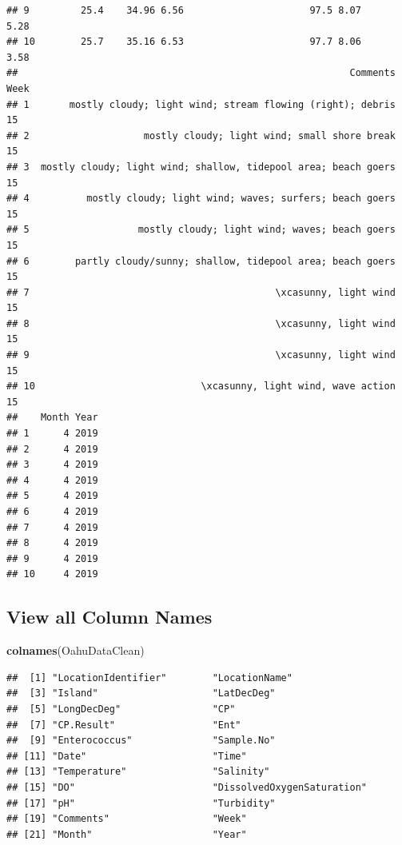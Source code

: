 \documentclass[12pt,]{article}
\newenvironment{Shaded}{\begin{snugshade}}{\end{snugshade}}
\newcommand{\KeywordTok}[1]{\textcolor[rgb]{0.13,0.29,0.53}{\textbf{#1}}}
\newcommand{\NormalTok}[1]{#1}
\begin{document}
\begin{verbatim}
## 9         25.4    34.96 6.56                      97.5 8.07      5.28
## 10        25.7    35.16 6.53                      97.7 8.06      3.58
##                                                          Comments Week
## 1       mostly cloudy; light wind; stream flowing (right); debris   15
## 2                    mostly cloudy; light wind; small shore break   15
## 3  mostly cloudy; light wind; shallow, tidepool area; beach goers   15
## 4          mostly cloudy; light wind; waves; surfers; beach goers   15
## 5                   mostly cloudy; light wind; waves; beach goers   15
## 6        partly cloudy/sunny; shallow, tidepool area; beach goers   15
## 7                                           \xcasunny, light wind   15
## 8                                           \xcasunny, light wind   15
## 9                                           \xcasunny, light wind   15
## 10                             \xcasunny, light wind, wave action   15
##    Month Year
## 1      4 2019
## 2      4 2019
## 3      4 2019
## 4      4 2019
## 5      4 2019
## 6      4 2019
## 7      4 2019
## 8      4 2019
## 9      4 2019
## 10     4 2019
\end{verbatim}

\subsection{View all Column Names}\label{view-all-column-names}

\begin{Shaded}
\begin{Highlighting}[]
\KeywordTok{colnames}\NormalTok{(OahuDataClean)}
\end{Highlighting}
\end{Shaded}

\begin{verbatim}
##  [1] "LocationIdentifier"        "LocationName"             
##  [3] "Island"                    "LatDecDeg"                
##  [5] "LongDecDeg"                "CP"                       
##  [7] "CP.Result"                 "Ent"                      
##  [9] "Enterococcus"              "Sample.No"                
## [11] "Date"                      "Time"                     
## [13] "Temperature"               "Salinity"                 
## [15] "DO"                        "DissolvedOxygenSaturation"
## [17] "pH"                        "Turbidity"                
## [19] "Comments"                  "Week"                     
## [21] "Month"                     "Year"
\end{verbatim}
\end{document}
